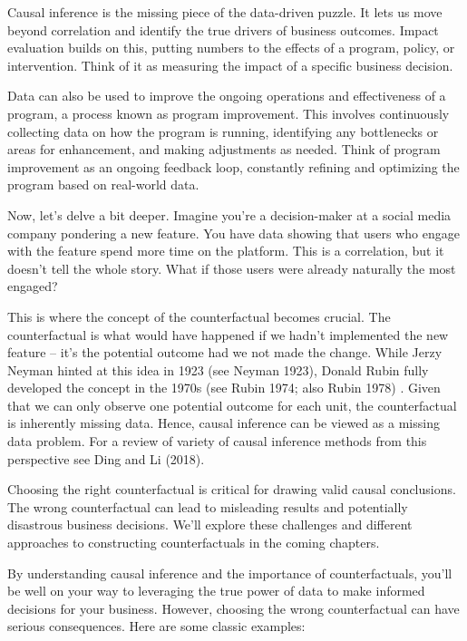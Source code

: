 \documentclass[
  letterpaper,
  DIV=11,
  numbers=noendperiod]{scrreprt}
\begin{document}
Causal inference is the missing piece of the data-driven puzzle. It lets
us move beyond correlation and identify the true drivers of business
outcomes. Impact evaluation builds on this, putting numbers to the
effects of a program, policy, or intervention. Think of it as measuring
the impact of a specific business decision.

Data can also be used to improve the ongoing operations and
effectiveness of a program, a process known as program improvement. This
involves continuously collecting data on how the program is running,
identifying any bottlenecks or areas for enhancement, and making
adjustments as needed. Think of program improvement as an ongoing
feedback loop, constantly refining and optimizing the program based on
real-world data.

Now, let's delve a bit deeper. Imagine you're a decision-maker at a
social media company pondering a new feature. You have data showing that
users who engage with the feature spend more time on the platform. This
is a correlation, but it doesn't tell the whole story. What if those
users were already naturally the most engaged?

This is where the concept of the counterfactual becomes crucial. The
counterfactual is what would have happened if we hadn't implemented the
new feature -- it's the potential outcome had we not made the change.
While Jerzy Neyman hinted at this idea in 1923 (see Neyman 1923), Donald
Rubin fully developed the concept in the 1970s (see Rubin 1974; also
Rubin 1978) . Given that we can only observe one potential outcome for
each unit, the counterfactual is inherently missing data. Hence, causal
inference can be viewed as a missing data problem. For a review of
variety of causal inference methods from this perspective see Ding and
Li (2018).

Choosing the right counterfactual is critical for drawing valid causal
conclusions. The wrong counterfactual can lead to misleading results and
potentially disastrous business decisions. We'll explore these
challenges and different approaches to constructing counterfactuals in
the coming chapters.

By understanding causal inference and the importance of counterfactuals,
you'll be well on your way to leveraging the true power of data to make
informed decisions for your business. However, choosing the wrong
counterfactual can have serious consequences. Here are some classic
examples:
\end{document}
